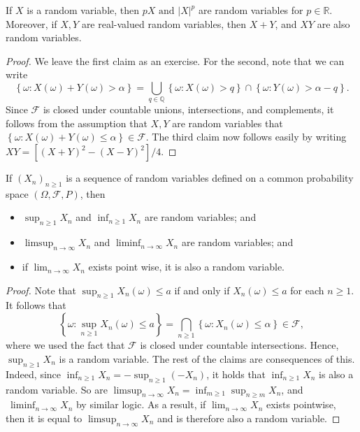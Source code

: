\begin{idea}{}{}
If \( X \) is a random variable, then \( pX \text{ and }  \left\lvert X \right\rvert ^p \) are random variables for \( p \in \mathbb{R}  \). Moreover, if \( X,Y \) are real-valued random variables, then \( X + Y \), and \( XY \) are also random variables. 

\tcbline

\begin{proof}
We leave the first claim as an exercise. For the second, note that we can write
\[
    \left\{ \omega : X(\omega ) + Y(\omega ) > \alpha  \right\} = \bigcup_{q\in \mathbb{Q} } \left\{ \omega :X(\omega )>q \right\} \cap \left\{ \omega :Y(\omega )>\alpha - q \right\}.
\]
Since \( \mathcal{F}  \) is closed under countable unions, intersections, and complements, it follows from the assumption that \( X, Y \) are random variables that \( \left\{ \omega : X(\omega ) + Y(\omega ) \leq \alpha  \right\} \in \mathcal{F}  \). The third claim now follows easily by writing \( XY = \left[ (X + Y)^{2} -(X - Y)^{2}  \right]/4  \).
\end{proof}

\end{idea}

\begin{idea}{}{}
If \( (X_{n} )_{n \geq 1}  \) is a sequence of random variables defined on a common probability space \( (\Omega , \mathcal{F} , P) \), then 
\begin{itemize}
    \item \( \sup _ {n\geq 1} X_{n} \) and \( \inf _{n\geq 1}X_{n}  \)  are random variables; and
    \item \( \limsup_{n \to \infty} X_{n}  \) and \( \liminf_{n \to \infty} X_{n}  \) are random variables; and 
    \item if \( \lim_{n \to \infty} X_{n}  \) exists point wise, it is also a random variable. 
\end{itemize}

\tcbline
\begin{proof}
Note that \( \sup _{n\geq 1}X_{n} (\omega )\leq a \) if and only if \( X_{n} (\omega ) \leq a \) for each \( n\geq 1 \). It follows that
\[
    \left\{ \omega : \sup _{n\geq 1}X_{n} (\omega )\leq a\right\} = \bigcap_{n\geq 1} \left\{ \omega : X_{n} (\omega ) \leq \alpha  \right\} \in \mathcal{F}, 
\]  where we used the fact that \( \mathcal{F} \) is closed under countable intersections. Hence, \( \sup _{n\geq 1}X_{n}  \) is a random variable. The rest of the claims are consequences of this. Indeed, since \( \inf _{n\geq 1} X_{n} = - \sup _{n\geq 1}(- X_{n} ) \), it holds that \( \inf _{n\geq 1}X_{n}  \)  is also a random variable. So are \( \limsup_{n \to \infty} X_{n} = \inf _{m\geq 1}\sup _{n\geq m}X_{n}  \), and \( \ \liminf_{n \to \infty} X_{n}  \)  by similar logic. As a result, if \( \lim_{n \to \infty} X_{n}  \) exists pointwise, then it is equal to \( \limsup_{n \to \infty} X_{n}  \) and is therefore also a random variable. 
\end{proof}

\end{idea}

